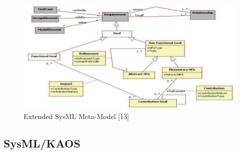 \documentclass[10pt, conference, compsocconf]{IEEEtran}
\def\sysml{\textsc{SysML}}
\def\kaos{\textsc{Kaos}}
\newcommand{\Myfig}[1]{Figure~\ref{fig:#1}}
\begin{document}
\begin{figure}[!t]
\centering
\includegraphics[width=5.5in]{fig5}
\caption{Extended SysML Meta-Model [13]}
\label{fig:meta}
\end{figure}

\subsection{SysML/KAOS}








\end{document}
